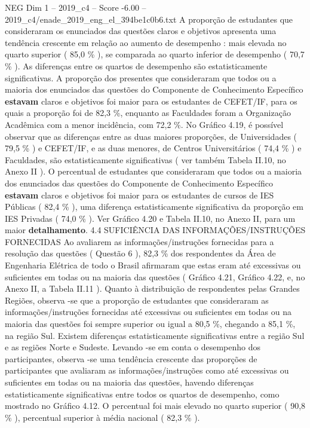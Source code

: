 \begin{textsample}{NEG Dim 1 – 2019\_c4 – Score -6.00 – 2019\_c4/enade\_2019\_eng\_el\_394be1c0b6.txt}
A proporção de estudantes que consideraram os enunciados das questões claros e objetivos apresenta uma tendência crescente em relação ao aumento de desempenho : mais elevada no quarto superior ( 85,0 \% ), se comparada ao quarto inferior de desempenho ( 70,7 \% ).
As diferenças entre os quartos de desempenho são estatisticamente significativas.
A proporção dos presentes que consideraram que todos ou a maioria dos enunciados das questões do Componente de Conhecimento Específico \textbf{estavam} claros e objetivos foi maior para os estudantes de CEFET/IF, para os quais a proporção foi de 82,3 \%, enquanto as Faculdades foram a Organização Acadêmica com a menor incidência, com 72,2 \%.
No Gráfico 4.19, é possível observar que as diferenças entre as duas maiores proporções, de Universidades ( 79,5 \% ) e CEFET/IF, e as duas menores, de Centros Universitários ( 74,4 \% ) e Faculdades, são estatisticamente significativas ( ver também Tabela II.10, no Anexo II ).
O percentual de estudantes que consideraram que todos ou a maioria dos enunciados das questões do Componente de Conhecimento Específico \textbf{estavam} claros e objetivos foi maior para os estudantes de cursos de IES Públicas ( 82,4 \% ), uma diferença estatisticamente significativa da proporção em IES Privadas ( 74,0 \% ).
Ver Gráfico 4.20 e Tabela II.10, no Anexo II, para um maior \textbf{detalhamento}. 4.4 SUFICIÊNCIA DAS INFORMAÇÕES/INSTRUÇÕES FORNECIDAS Ao avaliarem as informações/instruções fornecidas para a resolução das questões ( Questão 6 ), 82,3 \% dos respondentes da Área de Engenharia Elétrica de todo o Brasil afirmaram que estas eram até excessivas ou suficientes em todas ou na maioria das questões ( Gráfico 4.21, Gráfico 4.22, e, no Anexo II, a Tabela II.11 ).
Quanto à distribuição de respondentes pelas Grandes Regiões, observa -se que a proporção de estudantes que consideraram as informações/instruções fornecidas até excessivas ou suficientes em todas ou na maioria das questões foi sempre superior ou igual a 80,5 \%, chegando a 85,1 \%, na região Sul.
Existem diferenças estatisticamente significativas entre a região Sul e as regiões Norte e Sudeste.
Levando -se em conta o desempenho dos participantes, observa -se uma tendência crescente das proporções de participantes que avaliaram as informações/instruções como até excessivas ou suficientes em todas ou na maioria das questões, havendo diferenças estatisticamente significativas entre todos os quartos de desempenho, como mostrado no Gráfico 4.12.
O percentual foi mais elevado no quarto superior ( 90,8 \% ), percentual superior à média nacional ( 82,3 \% ).

\end{textsample}
